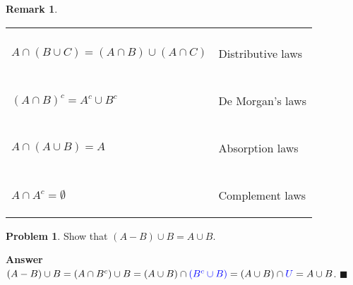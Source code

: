 \documentclass[12pt,letterpaper]{book}
\def\blue{\textcolor{blue}}
\numberwithin{equation}{section}
\theoremstyle{definition}
\newtheorem{problem}[thm]{\textbf{Problem}}
\newtheorem{remark}[thm]{\textbf{Remark}}
\newenvironment{answer}{\noindent\textbf{Answer}}{\hfill$\blacksquare$\vspace{0.1in}}
\begin{document}
\begin{remark}
\begin{center}
\begin{tabular}{|m{7cm}||m{5cm}|}
\hline
\begin{center}  $A\cup (B\cap C)=(A\cup B)\cap (A\cup C)$ \\ $A\cap (B\cup C)=(A\cap B)\cup (A\cap C)$ \end{center} & \begin{center} Distributive laws\index{Distributive laws}  \end{center}  \\
\hline
\begin{center} $(A\cup B)^c=A^c\cap B^c$ \\ $(A\cap B)^c=A^c\cup B^c$ \end{center} & \begin{center} De Morgan's laws\index{De Morgan's laws}  \end{center}  \\
\hline
\begin{center}  $A \cup (A \cap B) = A $ \\ $A \cap (A \cup B) = A$ \end{center} & \begin{center} Absorption laws  \end{center}  \\
\hline
\begin{center}  $A \cup A^c = U$ \\ $A \cap A^c =\emptyset$ \end{center} & \begin{center} Complement laws  \end{center}  \\
\hline
\end{tabular}
\end{center}
\end{remark}
\newpage

\begin{problem}
Show that $(A-B)\cup B=A\cup B$.
\end{problem}

\begin{answer}
$(A-B)\cup B=(A\cap B^c)\cup B=(A\cup B)\cap \blue{(B^c\cup B)}=(A\cup B)\cap \blue{U}=A\cup B$.
\end{answer}
\end{document}
